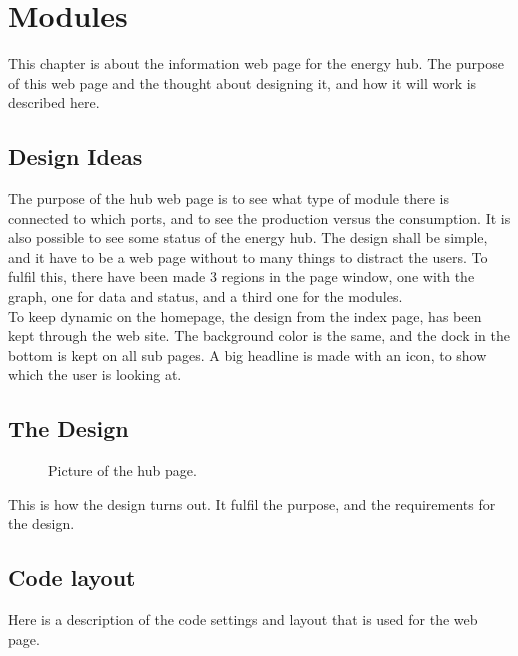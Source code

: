 \newpage
\chapter{Modules}
This chapter is about the information web page for the energy hub. The purpose of this web page and the thought about designing it, and how it will work is described here.
\section{Design Ideas}
The purpose of the hub web page is to see what type of module there is connected to which ports, and to see the production versus the consumption. It is also possible to see some status of the energy hub. The design shall be simple, and it have to be a web page without to many things to distract the users. To fulfil this, there have been made 3 regions in the page window, one with the graph, one for data and status, and a third one for the modules.\\
To keep dynamic on the homepage, the design from the index page, has been kept through the web site. The background color is the same, and the dock in the bottom is kept on all sub pages. A big headline is made with an icon, to show which the user is looking at.
\section{The Design}

\begin{figure}[h!]
	\center
		\setlength\fboxsep{0pt}
		\setlength\fboxrule{1pt}
   	\caption{Picture of the hub page.}
   	\label{fig:hub_page_design}
\end{figure}
This is how the design turns out. It fulfil the purpose, and the requirements for the design.
\section{Code layout}
Here is a description of the code settings and layout that is used for the web page.
